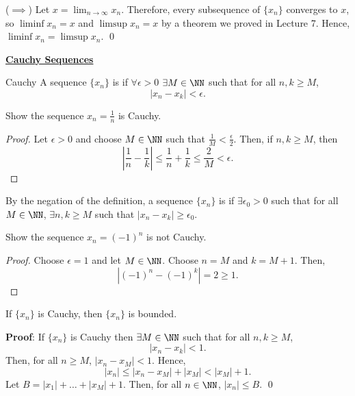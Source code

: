 ($\implies$) Let $x = \lim_{n\to \infty} x_n$. Therefore, every subsequence of $\{x_n\}$ converges to $x$, so $\liminf x_n = x$ and $\limsup x_n =x$ by a theorem we proved in Lecture 7. Hence, $\liminf x_n = \limsup x_n.$ \qed 


\noindent\underline{\textbf{Cauchy Sequences}}

\begin{definition}{Cauchy}
A sequence $\{x_n\}$ is  if $\forall \epsilon>0$ $\exists M \in \NN$ such that for all $n,k \geq M$,
\[
|x_n - x_k| <\epsilon.
\]
\end{definition}

\begin{example}
Show the sequence $x_n = \frac{1}{n}$ is Cauchy. 
\end{example}
\begin{proof}
Let $\epsilon>0$ and choose $M \in \NN$ such that $\frac{1}{M} < \frac{\epsilon}{2}$. Then, if $n,k\geq M$, then 
\[
\left|\frac{1}{n} - \frac{1}{k}\right| \leq \frac{1}{n} + \frac{1}{k} \leq \frac{2}{M} < \epsilon.
\]
\end{proof}

\begin{negation}
By the negation of the definition, a sequence $\{x_n\}$ is  if $\exists \epsilon_0 >0$ such that for all $M\in \NN$, $\exists n,k\geq M$ such that $|x_n - x_k| \geq \epsilon_0$.
\end{negation}

\begin{example}
Show the sequence $x_n = (-1)^n$ is not Cauchy.
\end{example}
\begin{proof}
Choose $\epsilon = 1$ and let $M\in \NN$. Choose $n = M$ and $k = M+1$. Then, 
\[
|(-1)^n - (-1)^k| = 2 \geq 1.
\]
\end{proof}

\begin{theorem}
If $\{x_n\}$ is Cauchy, then $\{x_n\}$ is bounded.
\end{theorem}
\textbf{Proof}: If $\{x_n\}$ is Cauchy then $\exists M\in \NN$ such that for all $n,k\geq M$, 
\[
|x_n - x_k|< 1.
\]
Then, for all $n\geq M$, $|x_n - x_M| <1.$ Hence, 
\[
|x_n| \leq |x_n-x_M| + |x_M| < |x_M| + 1.
\]
Let $B = |x_1|+\dots+|x_M|+1$. Then, for all $n\in \NN$, $|x_n| \leq B.$ \qed 

